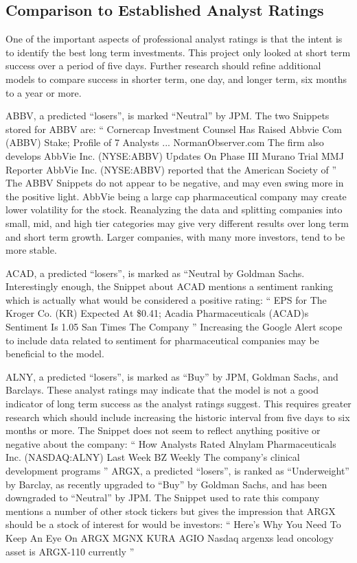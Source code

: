 \documentclass[sigconf]{acmart}
\begin{document}
\subsection{Comparison to Established Analyst Ratings}
One of the important aspects of professional analyst ratings is that the intent is to identify the best long term investments. This project only looked at short term success over a period of five days. Further research should refine additional models to compare success in shorter term, one day, and longer term, six months to a year or more.

ABBV, a predicted ``losers'', is marked ``Neutral'' by JPM. The two Snippets stored for ABBV are:
``
Cornercap Investment Counsel Has Raised Abbvie Com (ABBV) Stake; Profile of 7 Analysts ... NormanObserver.com The firm also develops
AbbVie Inc. (NYSE:ABBV) Updates On Phase III Murano Trial MMJ Reporter AbbVie Inc. (NYSE:ABBV) reported that the American Society of
''
The ABBV Snippets do not appear to be negative, and may even swing more in the positive light. AbbVie being a large cap pharmaceutical company may create lower volatility for the stock. Reanalyzing the data and splitting companies into small, mid, and high tier categories may give very different results over long term and short term growth. Larger companies, with many more investors, tend to be more stable.

ACAD, a predicted ``losers'', is marked as ``Neutral by Goldman Sachs. Interestingly enough, the Snippet about ACAD mentions a sentiment ranking which is actually what would be considered a positive rating:
``
EPS for The Kroger Co. (KR) Expected At \$0.41; Acadia Pharmaceuticals (ACAD)s Sentiment Is 1.05 San Times The Company
''
Increasing the Google Alert scope to include data related to sentiment for pharmaceutical companies may be beneficial to the model.

ALNY, a predicted ``losers'', is marked as ``Buy'' by JPM, Goldman Sachs, and Barclays. These analyst ratings may indicate that the model is not a good indicator of long term success as the analyst ratings suggest. This requires greater research which should include increasing the historic interval from five days to six months or more. The Snippet does not seem to reflect anything positive or negative about the company:
``
How Analysts Rated Alnylam Pharmaceuticals Inc. (NASDAQ:ALNY) Last Week BZ Weekly The company's clinical development programs
''
ARGX, a predicted ``losers'', is ranked as ``Underweight'' by Barclay, as recently upgraded to ``Buy'' by Goldman Sachs, and has been downgraded to ``Neutral'' by JPM. The Snippet used to rate this company mentions a number of other stock tickers but gives the impression that ARGX should be a stock of interest for would be investors:
``
Here's Why You Need To Keep An Eye On ARGX MGNX KURA AGIO Nasdaq argenxs lead oncology asset is ARGX-110 currently
''
\end{document}
